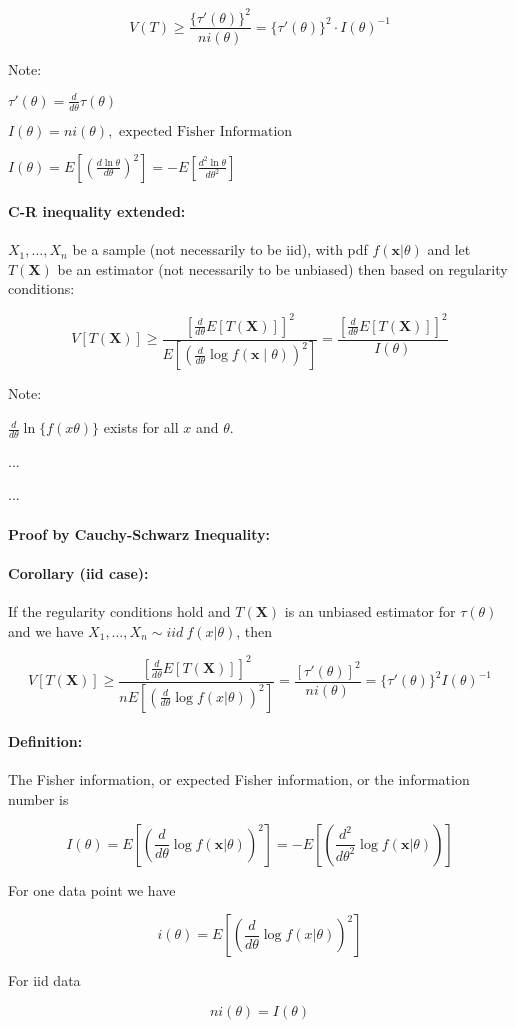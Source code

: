 \documentclass[a4paper, 11pt, twoside]{article}
\begin{document}
\[V(T)\geq\frac{\{\tau'(\theta)\}^2}{ni(\theta)}=\{\tau'(\theta)\}^2\cdot I(\theta)^{-1}\] 

Note:

$\tau'(\theta)=\frac{d}{d\theta}\tau(\theta)$

$I(\theta)=ni(\theta), \text{ expected Fisher Information}$

$I(\theta)=E\left[\left(\frac{d\ln\theta}{d\theta}\right)^2\right]=-E\left[\frac{d^2\ln\theta}{d\theta^2}\right]$

\paragraph{C-R inequality extended:} $X_1,\dots,X_n$ be a sample (not necessarily to be iid), with pdf $f(\mathbf{x}|\theta)$ and let $T(\mathbf{X})$ be an estimator (not necessarily to be unbiased) then based on regularity conditions:

\[V[T(\mathbf{X})]\geq\frac{\left[\frac{d}{d\theta}E[T(\mathbf{X})]\right]^2}{E\left[\left(\frac{d}{d\theta}\log f(\mathbf{x}\mid\theta)\right)^2\right]}=\frac{\left[\frac{d}{d\theta}E[T(\mathbf{X})]\right]^2}{I(\theta)}\]

Note:

$\frac{d}{d\theta}\ln{\{f(x\theta)}\}$ exists for all $x$ and $\theta$.

...

...

\paragraph{Proof by Cauchy-Schwarz Inequality:}

\paragraph{Corollary (iid case):} If the regularity conditions hold and $T(\mathbf{X})$ is an unbiased estimator for $\tau(\theta)$ and we have $X_1,\dots, X_n\sim iid\ f(x|\theta)$, then

\[V[T(\mathbf{X})]\geq \frac{\left[\frac{d}{d\theta}E[T(\mathbf{X})]\right]^2}{nE\left[\left(\frac{d}{d\theta}\log f(x|\theta)\right)^2\right]}=\frac{[\tau'(\theta)]^2}{ni(\theta)}=\{\tau'(\theta)\}^2I(\theta)^{-1}\]

\paragraph{Definition:} The Fisher information, or expected Fisher information, or the information number is

\[I(\theta)=E\left[\left(\frac{d}{d\theta}\log f(\mathbf{x}|\theta)\right)^2\right]=-E\left[\left(\frac{d^2}{d\theta^2}\log f(\mathbf{x}|\theta)\right)\right]\]

For one data point we have

\[i(\theta)=E\left[\left(\frac{d}{d\theta}\log{f(x|\theta)}\right)^2\right]\]

For iid data

\[ni(\theta) = I(\theta)\]
\end{document}
